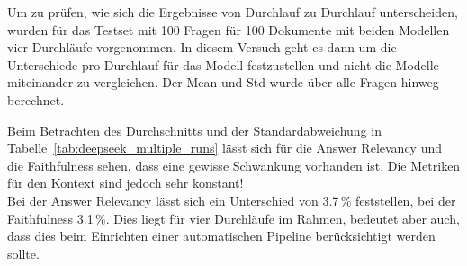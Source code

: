 Um zu prüfen, wie sich die Ergebnisse von Durchlauf zu Durchlauf unterscheiden, wurden für das Testset mit 100 Fragen für 100 Dokumente mit beiden Modellen vier Durchläufe vorgenommen.
In diesem Versuch geht es dann um die Unterschiede pro Durchlauf für das Modell festzustellen und nicht die Modelle miteinander zu vergleichen.
Der Mean und Std wurde über alle Fragen hinweg berechnet.

%


\begin{table}[h!]
    \centering
    \caption[DeepSeek Abweichungen mehrere Durchläufe]{Durchschnittswerte und Standardabweichungen der Metriken über vier Durchläufe für DeepSeek}
    \label{tab:deepseek_multiple_runs}
\end{table}

Beim Betrachten des Durchschnitts und der Standardabweichung in Tabelle~\ref{tab:deepseek_multiple_runs} lässt sich für die Answer Relevancy und die Faithfulness sehen, dass eine gewisse Schwankung vorhanden ist.
Die Metriken für den Kontext sind jedoch sehr konstant!\\
Bei der Answer Relevancy lässt sich ein Unterschied von 3.7\,\% feststellen, bei der Faithfulness 3.1\,\%.
Dies liegt für vier Durchläufe im Rahmen, bedeutet aber auch, dass dies beim Einrichten einer automatischen Pipeline berücksichtigt werden sollte.

